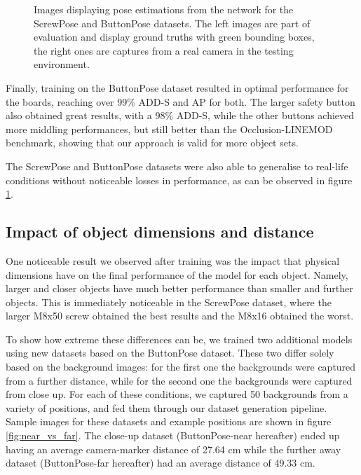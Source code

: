 \begin{figure}[htp]


    \caption{Images displaying pose estimations from the network for the ScrewPose and ButtonPose datasets. The left images are part of evaluation and display ground truths with green bounding boxes, the right ones are captures from a real camera in the testing environment.}
    \label{fig:inferencing}
\end{figure}

Finally, training on the ButtonPose dataset resulted in optimal performance for the boards, reaching over 99\% ADD-S and AP for both. The larger safety button also obtained great results, with a 98\% ADD-S, while the other buttons achieved more middling performances, but still better than the Occlusion-LINEMOD benchmark, showing that our approach is valid for more object sets.

The ScrewPose and ButtonPose datasets were also able to generalise to real-life conditions without noticeable losses in performance, as can be observed in figure \ref{fig:inferencing}.

\subsection{Impact of object dimensions and distance}

One noticeable result we observed after training was the impact that physical dimensions have on the final performance of the model for each object. Namely, larger and closer objects have much better performance than smaller and further objects. This is immediately noticeable in the ScrewPose dataset, where the larger M8x50 screw obtained the best results and the M8x16 obtained the worst.

To show how extreme these differences can be, we trained two additional models using new datasets based on the ButtonPose dataset. These two differ solely based on the background images: for the first one the backgrounds were captured from a further distance, while for the second one the backgrounds were captured from close up. For each of these conditions, we captured 50 backgrounds from a variety of positions, and fed them through our dataset generation pipeline. Sample images for these datasets and example positions are shown in figure \ref{fig:near_vs_far}. The close-up dataset (ButtonPose-near hereafter) ended up having an average camera-marker distance of 27.64 cm while the further away dataset (ButtonPose-far hereafter) had an average distance of 49.33 cm.

